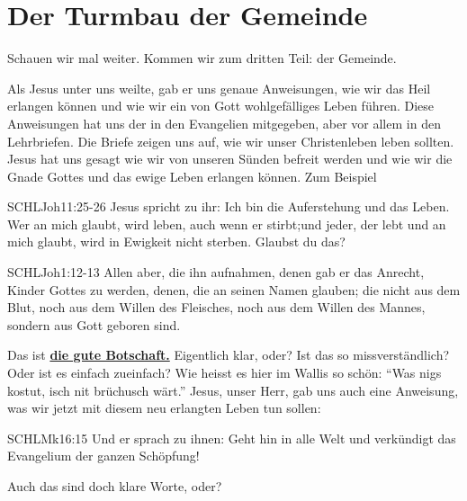 \documentclass[12pt]{../../inc/mybib}
\newenvironment{block}[1][]{%
  \vspace{1.5em}%
  \noindent\textbf{#1}\par%
  \vspace{0.0em}%
}{%
  \vspace{1em}%
}
\begin{document}
    \section{Der Turmbau der Gemeinde}
    Schauen wir mal weiter. Kommen wir zum dritten Teil:  der Gemeinde.
    \begin{block}
    Als Jesus unter uns weilte, gab er uns genaue Anweisungen, wie wir das Heil erlangen können und wie wir ein von Gott wohlgefälliges Leben führen. Diese Anweisungen hat uns der \herr{} in den Evangelien mitgegeben, aber vor allem in den Lehrbriefen. Die Briefe zeigen uns auf, wie wir unser Christenleben leben sollten.
    Jesus hat uns gesagt wie wir von unseren Sünden befreit werden und wie wir die Gnade Gottes und das ewige Leben erlangen können. Zum Beispiel
    \begin{bibelbox}{SCHL}{Joh}{11:25-26}
        Jesus spricht zu ihr: Ich bin die Auferstehung und das Leben. Wer an mich glaubt, wird leben, auch wenn er stirbt;und jeder, der lebt und an mich glaubt, wird in Ewigkeit nicht sterben. Glaubst du das?
    \end{bibelbox} 
    \begin{bibelbox}{SCHL}{Joh}{1:12-13}
        Allen aber, die ihn aufnahmen, denen gab er das Anrecht, Kinder Gottes zu werden, denen, die an seinen Namen glauben;
        die nicht aus dem Blut, noch aus dem Willen des Fleisches, noch aus dem Willen des Mannes, sondern aus Gott geboren sind.
    \end{bibelbox} 
    Das ist \textbf{\underline{die gute Botschaft.}}
    Eigentlich klar, oder? Ist das so missverständlich? Oder ist es einfach zueinfach? Wie heisst es hier im Wallis so schön: \enquote{Was nigs kostut, isch nit brüchusch wärt.} Jesus, unser Herr, gab uns auch eine Anweisung, was wir jetzt mit diesem neu erlangten Leben tun sollen:
    \begin{bibelbox}{SCHL}{Mk}{16:15}
        Und er sprach zu ihnen: Geht hin in alle Welt und verkündigt das Evangelium der ganzen Schöpfung!
    \end{bibelbox} 
    Auch das sind doch klare Worte, oder?
\end{block}
\end{document}
